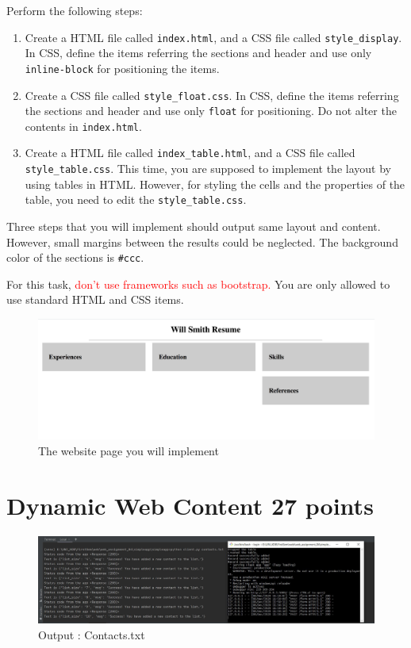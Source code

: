 \documentclass{resources/WeSTassignment}
\begin{document}
Perform the following steps:
\begin{enumerate}
    \item Create a HTML file called \texttt{index.html}, and a CSS file called \texttt{style\_display}. In CSS, define the items referring the sections and header and use only \texttt{inline-block} for positioning the items.
    \item Create a CSS file called \texttt{style\_float.css}. In CSS, define the items referring the sections and header and use only \texttt{float} for positioning. Do not alter the contents in \texttt{index.html}.
    \item Create a HTML file called \texttt{index\_table.html}, and a CSS file called \texttt{style\_table.css}. This time, you are supposed to implement the layout by using tables in HTML. However, for styling the cells and the properties of the table, you need to edit the \texttt{style\_table.css}.
\end{enumerate}

Three steps that you will implement should output same layout and content. However, small margins between the results could be neglected. The background color of the sections is \texttt{\#ccc}.

For this task, \textcolor{red}{don't use frameworks such as bootstrap.} You are only allowed to use standard HTML and CSS items. 

\begin{figure}[ht]
    \centering
    \includegraphics[scale=0.4]{html.png}
    \caption{The website page you will implement}
    \label{fig:my_label}
\end{figure}

\section{Dynamic Web Content \hfill{27 points}}

	   \begin{figure}[ht]
    			\centering
    			\includegraphics[scale=0.4]{resources/finalContactsServer.JPG}
    			\caption{Output : Contacts.txt}
    			\label{fig:contacts.txt}
\end{figure}
\end{document}
